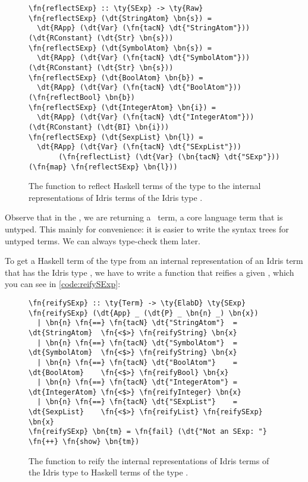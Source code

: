 \begin{figure}[H]
\caption{The function to reflect Haskell terms of the type  to the
internal representations of Idris terms of the Idris type .}
\label{code:reflectSExp}
\begin{Verbatim}[framesep=2mm, label=\footnotesize{\normalfont{Haskell}}, labelposition=topline]
\fn{reflectSExp} :: \ty{SExp} -> \ty{Raw}
\fn{reflectSExp} (\dt{StringAtom} \bn{s}) =
  \dt{RApp} (\dt{Var} (\fn{tacN} \dt{"StringAtom"})) (\dt{RConstant} (\dt{Str} \bn{s}))
\fn{reflectSExp} (\dt{SymbolAtom} \bn{s}) =
  \dt{RApp} (\dt{Var} (\fn{tacN} \dt{"SymbolAtom"})) (\dt{RConstant} (\dt{Str} \bn{s}))
\fn{reflectSExp} (\dt{BoolAtom} \bn{b}) =
  \dt{RApp} (\dt{Var} (\fn{tacN} \dt{"BoolAtom"})) (\fn{reflectBool} \bn{b})
\fn{reflectSExp} (\dt{IntegerAtom} \bn{i}) =
  \dt{RApp} (\dt{Var} (\fn{tacN} \dt{"IntegerAtom"})) (\dt{RConstant} (\dt{BI} \bn{i}))
\fn{reflectSExp} (\dt{SexpList} \bn{l}) =
  \dt{RApp} (\dt{Var} (\fn{tacN} \dt{"SExpList"}))
       (\fn{reflectList} (\dt{Var} (\bn{tacN} \dt{"SExp"})) (\fn{map} \fn{reflectSExp} \bn{l}))
\end{Verbatim}
\end{figure}

Observe that in the , we are returning a \Raw\ term, a core
language term that is untyped. This mainly for convenience: it is easier to
write the syntax trees for untyped terms. We can always type-check them later.

To get a Haskell term of the type  from an internal representation of
an Idris term that has the Idris type , we have to write a function
 that reifies a given , which you can see in
\autoref{code:reifySExp}:

\begin{figure}[H]
\caption{The function to reify the internal representations of Idris terms
  of the Idris type  to Haskell terms of the type .}
\label{code:reifySExp}
\begin{Verbatim}[framesep=2mm, label=\footnotesize{\normalfont{Haskell}}, labelposition=topline]
\fn{reifySExp} :: \ty{Term} -> \ty{ElabD} \ty{SExp}
\fn{reifySExp} (\dt{App} _ (\dt{P} _ \bn{n} _) \bn{x})
  | \bn{n} \fn{==} \fn{tacN} \dt{"StringAtom"}  = \dt{StringAtom}  \fn{<$>} \fn{reifyString} \bn{x}
  | \bn{n} \fn{==} \fn{tacN} \dt{"SymbolAtom"}  = \dt{SymbolAtom}  \fn{<$>} \fn{reifyString} \bn{x}
  | \bn{n} \fn{==} \fn{tacN} \dt{"BoolAtom"}    = \dt{BoolAtom}    \fn{<$>} \fn{reifyBool} \bn{x}
  | \bn{n} \fn{==} \fn{tacN} \dt{"IntegerAtom"} = \dt{IntegerAtom} \fn{<$>} \fn{reifyInteger} \bn{x}
  | \bn{n} \fn{==} \fn{tacN} \dt{"SExpList"}    = \dt{SexpList}    \fn{<$>} \fn{reifyList} \fn{reifySExp} \bn{x}
\fn{reifySExp} \bn{tm} = \fn{fail} (\dt{"Not an SExp: "} \fn{++} \fn{show} \bn{tm})
\end{Verbatim}
\end{figure}

